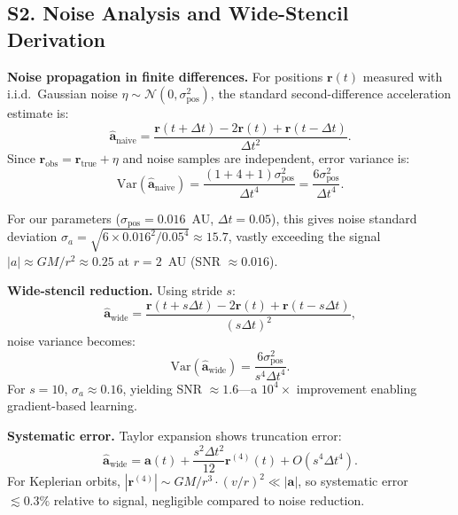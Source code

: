 \documentclass[9pt,twocolumn,twoside]{pnas-new}
\begin{document}
\subsection*{S2. Noise Analysis and Wide-Stencil Derivation}
\textbf{Noise propagation in finite differences.} For positions $\mathbf{r}(t)$ measured with i.i.d.\ Gaussian noise $\eta \sim \mathcal{N}(0, \sigma_{\text{pos}}^2)$, the standard second-difference acceleration estimate is:
\begin{equation}
\hat{\mathbf{a}}_{\text{naive}} = \frac{\mathbf{r}(t+\Delta t) - 2\mathbf{r}(t) + \mathbf{r}(t-\Delta t)}{\Delta t^2}.
\end{equation}
Since $\mathbf{r}_{\text{obs}} = \mathbf{r}_{\text{true}} + \eta$ and noise samples are independent, error variance is:
\begin{equation}
\text{Var}(\hat{\mathbf{a}}_{\text{naive}}) = \frac{(1 + 4 + 1) \sigma_{\text{pos}}^2}{\Delta t^4} = \frac{6\sigma_{\text{pos}}^2}{\Delta t^4}.
\end{equation}

For our parameters ($\sigma_{\text{pos}} = 0.016$~AU, $\Delta t = 0.05$), this gives noise standard deviation $\sigma_a = \sqrt{6 \times 0.016^2 / 0.05^4} \approx 15.7$, vastly exceeding the signal $|a| \approx GM/r^2 \approx 0.25$ at $r = 2$~AU (SNR $\approx 0.016$).

\textbf{Wide-stencil reduction.} Using stride $s$:
\begin{equation}
\hat{\mathbf{a}}_{\text{wide}} = \frac{\mathbf{r}(t+s\Delta t) - 2\mathbf{r}(t) + \mathbf{r}(t-s\Delta t)}{(s\Delta t)^2},
\end{equation}
noise variance becomes:
\begin{equation}
\text{Var}(\hat{\mathbf{a}}_{\text{wide}}) = \frac{6\sigma_{\text{pos}}^2}{s^4 \Delta t^4}.
\end{equation}
For $s=10$, $\sigma_a \approx 0.16$, yielding SNR $\approx 1.6$---a $10^4\times$ improvement enabling gradient-based learning.

\textbf{Systematic error.} Taylor expansion shows truncation error:
\begin{equation}
\hat{\mathbf{a}}_{\text{wide}} = \mathbf{a}(t) + \frac{s^2 \Delta t^2}{12} \mathbf{r}^{(4)}(t) + O(s^4 \Delta t^4).
\end{equation}
For Keplerian orbits, $|\mathbf{r}^{(4)}| \sim GM/r^3 \cdot (v/r)^2 \ll |\mathbf{a}|$, so systematic error $\lesssim 0.3\%$ relative to signal, negligible compared to noise reduction.
\end{document}
